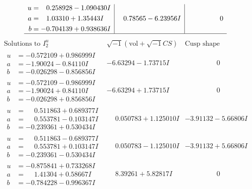 \documentclass[1p]{elsarticle_modified}
\theoremstyle{definition}
\newcommand{\I}{\sqrt{-1}}
\begin{document}
$$\begin{array}{c|c|c}
\begin{aligned}
u &= \phantom{-}0.258928 - 1.090430 I \\
a &= \phantom{-}1.03310 + 1.35443 I \\
b &= -0.704139 + 0.938636 I\end{aligned}
 & \phantom{-}0.78565 - 6.23956 I & \phantom{-0.000000 } 0\\
 \hline 
 \end{array}$$\newpage$$\begin{array}{c|c|c}  
\text{Solutions to }I^u_{2}& \I (\text{vol} + \sqrt{-1}CS) & \text{Cusp shape}\\
 \hline 
\begin{aligned}
u &= -0.572109 + 0.986999 I \\
a &= -1.90024 - 0.84110 I \\
b &= -0.026298 - 0.856856 I\end{aligned}
 & -6.63294 - 1.73715 I & \phantom{-0.000000 } 0 \\ \hline\begin{aligned}
u &= -0.572109 - 0.986999 I \\
a &= -1.90024 + 0.84110 I \\
b &= -0.026298 + 0.856856 I\end{aligned}
 & -6.63294 + 1.73715 I & \phantom{-0.000000 } 0 \\ \hline\begin{aligned}
u &= \phantom{-}0.511863 + 0.689377 I \\
a &= \phantom{-}0.553781 - 0.103147 I \\
b &= -0.239361 + 0.530434 I\end{aligned}
 & \phantom{-}0.050783 + 1.125010 I & -3.91132 - 5.66806 I \\ \hline\begin{aligned}
u &= \phantom{-}0.511863 - 0.689377 I \\
a &= \phantom{-}0.553781 + 0.103147 I \\
b &= -0.239361 - 0.530434 I\end{aligned}
 & \phantom{-}0.050783 - 1.125010 I & -3.91132 + 5.66806 I \\ \hline\begin{aligned}
u &= -0.875841 + 0.733268 I \\
a &= \phantom{-}1.41304 + 0.58667 I \\
b &= -0.784228 - 0.996367 I\end{aligned}
 & \phantom{-}8.39261 + 5.82817 I & \phantom{-0.000000 } 0 \\ \hline\begin{aligned}

\end{aligned}
\end{array}$$
\end{document}
